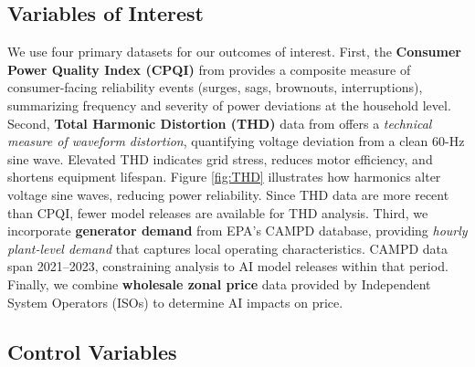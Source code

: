 \documentclass[a4paper,fleqn,longmktitle]{cas-sc}
\begin{document}
\subsection{Variables of Interest}

We use four primary datasets for our outcomes of interest. First, the \textbf{Consumer Power Quality Index (CPQI)} from \cite{WhiskerLabs_THD_2024} provides a composite measure of consumer-facing reliability events (surges, sags, brownouts, interruptions), summarizing frequency and severity of power deviations at the household level. Second, \textbf{Total Harmonic Distortion (THD)} data from \cite{WhiskerLabs_THD_2024} offers a \emph{technical measure of waveform distortion}, quantifying voltage deviation from a clean 60-Hz sine wave. Elevated THD indicates grid stress, reduces motor efficiency, and shortens equipment lifespan. Figure \ref{fig:THD} illustrates how harmonics alter voltage sine waves, reducing power reliability. Since THD data are more recent than CPQI, fewer model releases are available for THD analysis. Third, we incorporate \textbf{generator demand} from EPA's CAMPD database, providing \emph{hourly plant-level demand} that captures local operating characteristics. CAMPD data span 2021--2023, constraining analysis to AI model releases within that period. Finally, we combine \textbf{wholesale zonal price} data provided by Independent System Operators (ISOs) to determine AI impacts on price.
\subsection{Control Variables}
\end{document}
